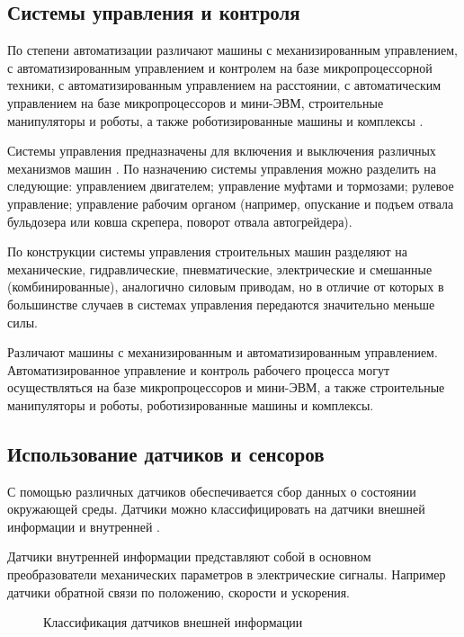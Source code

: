 \subsection{Системы управления и контроля}\label{subsec:ch1/sec2/sub1}

По степени автоматизации различают машины с механизированным управлением, с автоматизированным управлением и контролем на базе микропроцессорной техники, с автоматизированным управлением на расстоянии, с автоматическим управлением на базе микропроцессоров и мини-ЭВМ, строительные манипуляторы и роботы, а также роботизированные машины и комплексы \cite[с.~39]{Evtukov}.

Системы управления предназначены для включения и выключения различных механизмов машин \cite[с.~109]{Evtukov}.
По назначению системы управления можно разделить на следующие: управлением двигателем; управление муфтами и тормозами; рулевое управление; управление рабочим органом (например, опускание и подъем отвала бульдозера или ковша скрепера, поворот отвала автогрейдера).

По конструкции системы управления строительных машин разделяют на механические, гидравлические, пневматические, электрические и смешанные (комбинированные), аналогично силовым приводам, но в отличие от которых в большинстве случаев в системах управления передаются значительно меньше силы.

Различают машины с механизированным и автоматизированным управлением. Автоматизированное управление и контроль рабочего процесса могут осуществляться на базе микропроцессоров и мини-ЭВМ, а также строительные манипуляторы и роботы, роботизированные машины и комплексы.

\subsection{Использование датчиков и сенсоров}\label{subsec:ch1/sec2/sub2}

С помощью различных датчиков обеспечивается сбор данных о состоянии окружающей среды. Датчики можно классифицировать на датчики внешней информации и внутренней \cite[с.~131]{Vlasov}. 

Датчики внутренней информации представляют собой в основном преобразователи механических параметров в электрические сигналы. Например датчики обратной связи по положению, скорости и ускорения.

\begin{figure}[ht]
    \caption{Классификация датчиков внешней информации}\label{fig:datchiki}
\end{figure}

